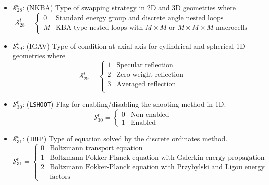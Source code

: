 \begin{itemize}
\item $\mathcal{S}^{t}_{28}$: (NKBA) Type of swapping strategy in 2D and 3D geometries where
\begin{displaymath}
\mathcal{S}^{t}_{28} = \left\{
\begin{array}{rl}
 0 & \textrm{Standard energy group and discrete angle nested loops}\\
 M & \textrm{KBA type nested loops with $M\times M$ or $M \times M \times M$ macrocells}
\end{array} \right.
\end{displaymath}

\item $\mathcal{S}^{t}_{29}$: (IGAV) Type of condition at axial axis for cylindrical and spherical 1D geometries where
\begin{displaymath}
\mathcal{S}^{t}_{29} = \left\{
\begin{array}{rl}
 1 & \textrm{Specular reflection}\\
 2 & \textrm{Zero-weight reflection}\\
 3 & \textrm{Averaged reflection}\\
\end{array} \right.
\end{displaymath}

\item $\mathcal{S}^{t}_{30}$: ({\tt LSHOOT}) Flag for enabling/disabling the shooting method in 1D.
\begin{displaymath}
\mathcal{S}^{t}_{30} = \left\{
\begin{array}{rl}
 0 & \textrm{Non enabled} \\
 1 & \textrm{Enabled}
\end{array} \right.
\end{displaymath}

\item $\mathcal{S}^{t}_{31}$: ({\tt IBFP}) Type of equation solved by the discrete ordinates method.
\begin{displaymath}
\mathcal{S}^{t}_{31} = \left\{
\begin{array}{rl}
 0 & \textrm{Boltzmann transport equation} \\
 1 & \textrm{Boltzmann Fokker-Planck equation with Galerkin energy propagation factors} \\
 2 & \textrm{Boltzmann Fokker-Planck equation with Przybylski and Ligou energy propagation} \\
  & \textrm{factors}
\end{array} \right.
\end{displaymath}


\end{itemize}

